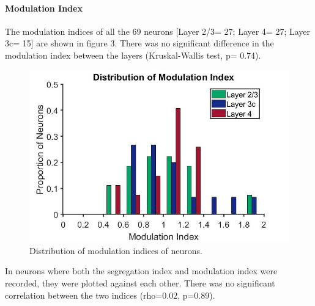 	\paragraph{Modulation Index}
	The modulation indices of all the 69 neurons [Layer 2/3= 27; Layer 4= 27; Layer 3c= 15] are shown in figure 3. There was no significant difference in the modulation index between the layers (Kruskal-Wallis test, p= 0.74).
	
		\begin{figure}[H]
		
		\includegraphics[width=\linewidth]{LinearV1/modind_layer_colour.jpg}
		\caption{Distribution of modulation indices of neurons.}
		\label{fig:fig4}
	\end{figure}
	In neurons where both the segregation index and modulation index were recorded, they were plotted against each other. There was no significant correlation between the two indices (rho=0.02, p=0.89). 
	

